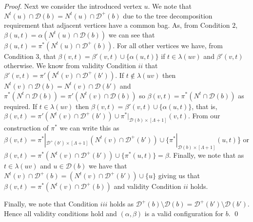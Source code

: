 \documentclass[runningheads]{llncs}
\begin{document}
\begin{proof}
Next we consider the introduced vertex $u$. We note that $N^t(u) \cap \mathcal{D}(b)=N^t(u)\cap\mathcal{D}^+(b)$ due to the tree decomposition requirement that adjacent vertices have a common bag.
As, from Condition $2$, $\beta(u,t)= \alpha(N^t(u) \cap \mathcal{D}(b))$  we can see that $\beta(u,t)=\pi^*(N^t(u)\cap\mathcal{D}^+(b))$.
For all other vertices we have, from Condition $3$, that $\beta(v,t)=\beta'(v,t) \cup \{\alpha(u,t)\}$ if $t \in \lambda(uv)$ and $\beta'(v,t)$ otherwise. We know from validity Condition $ii$ that $\beta'(v,t)=\pi'(N^t(v)\cap\mathcal{D}^+(b'))$. If $t \notin \lambda(uv)$ then $N^t(v) \cap \mathcal{D}(b)=N^t(v)\cap\mathcal{D}(b')$ and $\pi^*(N^t\cap\mathcal{D}(b))=\pi'(N^t(v)\cap \mathcal{D}(b))$ so $\beta(v,t)=\pi^*(N^t\cap\mathcal{D}(b))$ as required.
If $t \in \lambda(uv)$ then $\beta(v,t)=\beta'(v,t) \cup \{\alpha(u,t)\}$, that is, $\beta(v,t)=\pi'(N^t(v)\cap\mathcal{D}^+(b')) \cup \pi^*|_{\mathcal{D}(b) \times [\Lambda+1]}(v,t)$.
From our construction of $\pi^*$ we can write this as $\beta(v,t)=\pi^*|_{\mathcal{D}^+(b') \times [\Lambda+1]}(N^t(v)\cap\mathcal{D}^+(b')) \cup \{\pi^*|_{\mathcal{D}(b) \times [\Lambda+1]}(u,t)$\} or $\beta(v,t)=\pi^*(N^t(v)\cap\mathcal{D}^+(b')) \cup \{\pi^*(u,t)\}=\beta$. 
Finally, we note that as $t \in \lambda(uv)$ and $u \in \mathcal{D}(b)$ we have that $N^t(v) \cap\mathcal{D}^+(b)=(N^t(v)\cap\mathcal{D}^+(b')) \cup \{u\}$ giving us that $\beta(v,t)=\pi^*(N^t(v)\cap\mathcal{D}^+(b))$ and validity Condition $ii$ holds.

Finally, we note that Condition $iii$ holds as $\mathcal{D}^+(b) \setminus \mathcal{D}(b) = \mathcal{D}^+(b') \setminus \mathcal{D}(b')$. Hence all validity conditions hold and $(\alpha,\beta)$ is a valid configuration for $b$.
\qed \end{proof}
\end{document}

